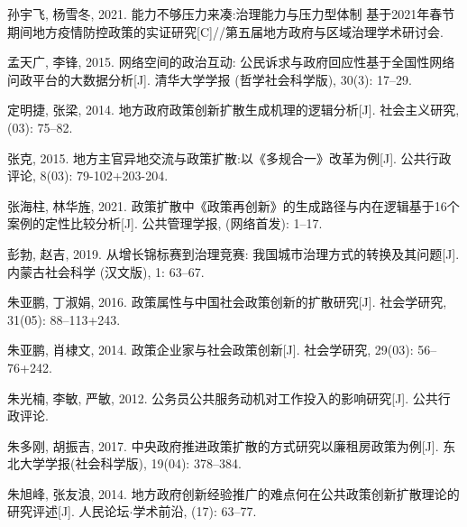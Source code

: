 \documentclass[
  12pt,
]{ctexart}
\newlength{\cslhangindent}
\newlength{\cslentryspacingunit} %
\newenvironment{CSLReferences}[2] %
 {%
  \setlength{\parindent}{0pt}
  \ifodd #1
  \let\oldpar\par
  \def\par{\hangindent=\cslhangindent\oldpar}
  \fi
  \setlength{\parskip}{#2\cslentryspacingunit}
 }%
 {}
\begin{document}
\begin{CSLReferences}{1}{0}
\leavevmode{}%
孙宇飞, 杨雪冬, 2021. 能力不够压力来凑:治理能力与压力型体制 \textemdash\textemdash 基于2021年春节期间地方疫情防控政策的实证研究{[}C{]}//第五届地方政府与区域治理学术研讨会.

\leavevmode{}%
孟天广, 李锋, 2015. 网络空间的政治互动: 公民诉求与政府回应性\textemdash\textemdash 基于全国性网络问政平台的大数据分析{[}J{]}. 清华大学学报 (哲学社会科学版), 30(3): 17--29.

\leavevmode{}%
定明捷, 张梁, 2014. {地方政府政策创新扩散生成机理的逻辑分析}{[}J{]}. 社会主义研究, (03): 75--82.

\leavevmode{}%
张克, 2015. {地方主官异地交流与政策扩散:以{《多规合一》}改革为例}{[}J{]}. 公共行政评论, 8(03): 79-102+203-204.

\leavevmode{}%
张海柱, 林华旌, 2021. {政策扩散中{《政策再创新》}的生成路径与内在逻辑\textemdash\textemdash 基于16个案例的定性比较分析}{[}J{]}. 公共管理学报, (网络首发): 1--17.

\leavevmode{}%
彭勃, 赵吉, 2019. 从增长锦标赛到治理竞赛: 我国城市治理方式的转换及其问题{[}J{]}. 内蒙古社会科学 (汉文版), 1: 63--67.

\leavevmode{}%
朱亚鹏, 丁淑娟, 2016. {政策属性与中国社会政策创新的扩散研究}{[}J{]}. 社会学研究, 31(05): 88--113+243.

\leavevmode{}%
朱亚鹏, 肖棣文, 2014. {政策企业家与社会政策创新}{[}J{]}. 社会学研究, 29(03): 56--76+242.

\leavevmode{}%
朱光楠, 李敏, 严敏, 2012. 公务员公共服务动机对工作投入的影响研究{[}J{]}. 公共行政评论.

\leavevmode{}%
朱多刚, 胡振吉, 2017. 中央政府推进政策扩散的方式研究\textemdash\textemdash 以廉租房政策为例{[}J{]}. 东北大学学报(社会科学版), 19(04): 378--384.

\leavevmode{}%
朱旭峰, 张友浪, 2014. {地方政府创新经验推广的难点何在\textemdash\textemdash 公共政策创新扩散理论的研究评述}{[}J{]}. 人民论坛{\(\cdot\)}学术前沿, (17): 63--77.


\end{CSLReferences}
\end{document}
